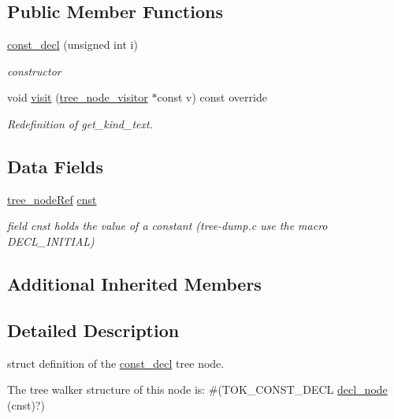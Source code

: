 \subsection*{Public Member Functions}
\begin{DoxyCompactItemize}
\item 
\hyperlink{structconst__decl_a960715e4d6abcbe360584eba210e9bf5}{const\+\_\+decl} (unsigned int i)
\begin{DoxyCompactList}\small\item\em constructor \end{DoxyCompactList}\item 
void \hyperlink{structconst__decl_a50bf1b7d73f36fdb7c5036eba097f97e}{visit} (\hyperlink{classtree__node__visitor}{tree\+\_\+node\+\_\+visitor} $\ast$const v) const override
\begin{DoxyCompactList}\small\item\em Redefinition of get\+\_\+kind\+\_\+text. \end{DoxyCompactList}\end{DoxyCompactItemize}
\subsection*{Data Fields}
\begin{DoxyCompactItemize}
\item 
\hyperlink{tree__node_8hpp_a6ee377554d1c4871ad66a337eaa67fd5}{tree\+\_\+node\+Ref} \hyperlink{structconst__decl_a44ff35a4eacdb5788d4effc80cd00bcb}{cnst}
\begin{DoxyCompactList}\small\item\em field cnst holds the value of a constant (tree-\/dump.\+c use the macro D\+E\+C\+L\+\_\+\+I\+N\+I\+T\+I\+AL) \end{DoxyCompactList}\end{DoxyCompactItemize}
\subsection*{Additional Inherited Members}


\subsection{Detailed Description}
struct definition of the \hyperlink{structconst__decl}{const\+\_\+decl} tree node. 

The tree walker structure of this node is\+: \#(T\+O\+K\+\_\+\+C\+O\+N\+S\+T\+\_\+\+D\+E\+CL \hyperlink{structdecl__node}{decl\+\_\+node} (cnst)?) 

